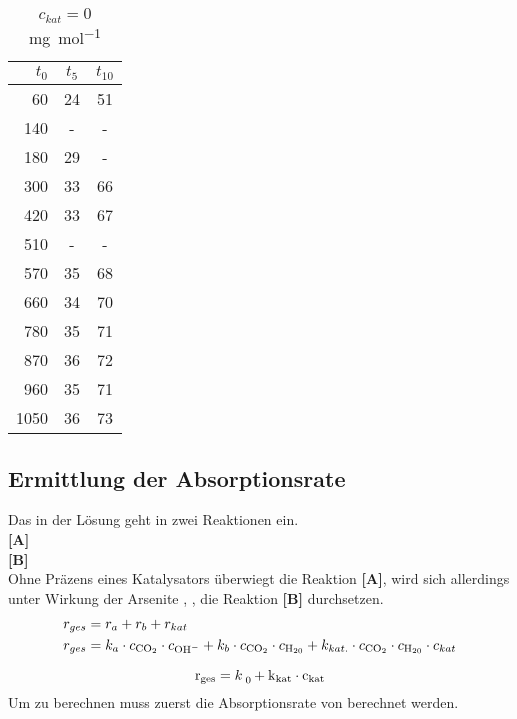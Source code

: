 \documentclass{article}
\begin{document}
\begin{onehalfspace}
\begin{table}[!htbp]
\parbox{.45\linewidth}{
\centering

\begin{tabular}{rcc}
\hline
 $t_0$ & $t_5$  & $t_{10}$ \\
\hline
60 & 24 & 51 \\
140 & - & - \\
180 & 29 & - \\
300 & 33 & 66 \\
420 & 33 & 67 \\
510 & - & - \\
570 & 35 & 68 \\
660 & 34 & 70 \\
780 & 35 & 71 \\
870 & 36 & 72 \\
960 & 35 & 71 \\
1050 & 36 & 73 \\
\hline
\end{tabular}
\caption{$c_{kat} = 0$ \si{\milli\gram\per\mol}}
}
\end{table}


\subsection{Ermittlung der Absorptionsrate}
  Das  in der Lösung geht in zwei Reaktionen ein.\\
 \textbf{[A]} \:  \\
 \textbf{[B]} \:  \\

Ohne Präzens eines Katalysators überwiegt die Reaktion \textbf{[A]}, 
wird sich allerdings unter Wirkung der Arsenite , ,
die Reaktion \textbf{[B]} durchsetzen. 
\begin{align}
  r_{ges} &= r _a + r _b + r _{kat}\\
  r_{ges} &= k_a \cdot c_{\ce{CO2}} \cdot c_{\ce{OH-}} + k_b \cdot c_{\ce{CO2}} \cdot c_{\ce{H20}} + k_{kat.} \cdot c_{\ce{CO2}} \cdot c_{\ce{H20}} \cdot c_{kat}   
\end{align}

\begin{equation}
  \ce{r_{ges}} = \ce{k _0} + \ce{k_{kat}} \cdot \ce{c_{kat}}
\end{equation}
Um  zu berechnen muss zuerst die Absorptionsrate von   berechnet werden.


\end{onehalfspace}
\end{document}
